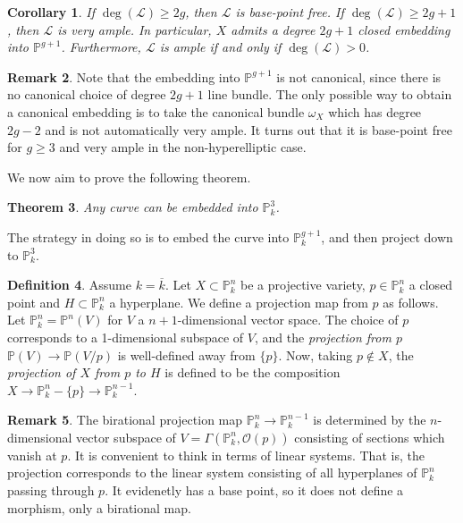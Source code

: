 \documentclass[10pt]{article}
\newtheorem{thm}{Theorem}[section]
\newtheorem{cor}[thm]{Corollary}
\theoremstyle{definition}
\newtheorem{defn}[thm]{Definition}
\newtheorem{rmk}[thm]{Remark}
\newcommand{\PP}{\mathbb{P}}
\newcommand{\OO}{\mathcal{O}}
\newcommand{\LL}{\mathcal{L}}
\begin{document}
\begin{cor}
If $\deg(\LL) \geq 2g$, then $\LL$ is base-point free.  If $\deg(\LL) \geq 2g+1$, then $\LL$ is very ample.  In particular, $X$ admits a degree $2g+1$ closed embedding into $\mathbb{P}^{g+1}$.  Furthermore, $\LL$ is ample if and only if $\deg(\LL) > 0$.
\end{cor}

\begin{rmk}
Note that the embedding into $\PP^{g+1}$ is not canonical, since there is no canonical choice of degree $2g+1$ line bundle.  The only possible way to obtain a canonical embedding is to take the canonical bundle $\omega_X$ which has degree $2g-2$ and is not automatically very ample.  It turns out that it is base-point free for $g\geq 3$ and very ample in the non-hyperelliptic case.
\end{rmk}

We now aim to prove the following theorem.
\begin{thm}
Any curve can be embedded into $\PP^3_k$.
\end{thm}

The strategy in doing so is to embed the curve into $\PP^{g+1}_k$, and then project down to $\PP^3_k$.
\begin{defn}
Assume $k = \overline{k}$.  Let $X \subset \PP^n_k$ be a projective variety, $p \in \PP^n_k$ a closed point and $H \subset \PP^n_k$ a hyperplane.  We define a projection map from $p$ as follows.  Let $\PP^n_k = \PP^n(V)$ for $V$ a $n+1$-dimensional vector space.  The choice of $p$ corresponds to a 1-dimensional subspace of $V$, and the \emph{projection from $p$} $\PP(V) \rightarrow \PP(V/p)$ is well-defined away from $\{p\}$.  Now, taking $p \not\in X$, the \emph{projection of $X$ from $p$ to $H$} is defined to be the composition $X \rightarrow \PP^n_k - \{p\} \rightarrow \PP^{n-1}_k$.
\end{defn}

\begin{rmk}
The birational projection map $\PP^n_k \rightarrow \PP^{n-1}_k$ is determined by the $n$-dimensional vector subspace of $V = \Gamma(\PP^n_k, \OO(p))$ consisting of sections which vanish at $p$.  It is convenient to think in terms of linear systems.  That is, the projection corresponds to the linear system consisting of all hyperplanes of $\PP^n_k$ passing through $p$.  It evidenetly has a base point, so it does not define a morphism, only a birational map.

\end{rmk}
\end{document}
